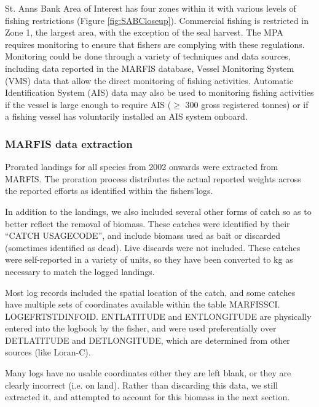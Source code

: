 \documentclass[letterpaper,portrait,11pt]{scrartcl}
\numberwithin{equation}{section}    %
\numberwithin{figure}{section}    %
\numberwithin{table}{section}       %
\begin{document}
St. Anns Bank Area of Interest has four zones within it with various levels of fishing restrictions (Figure \ref{fig:SABCloseup}). Commercial fishing is restricted in Zone 1, the largest area, with the exception of the seal harvest. The MPA requires monitoring to ensure that fishers are complying with these regulations. Monitoring could be done through a variety of techniques and data sources, including data reported in the MARFIS database, Vessel Monitoring System (VMS) data that allow the direct monitoring of fishing activities. Automatic Identification System (AIS) data may also be used to monitoring fishing activities if the vessel is large enough to require AIS ($\geq$ 300 gross registered tonnes) or if a fishing vessel has voluntarily installed an AIS system onboard.  


\subsubsection{MARFIS data extraction}

Prorated landings for all species from 2002 onwards were extracted from MARFIS. The proration process distributes the actual reported weights across the reported efforts as identified within the fishers\textquoteright logs.  

In addition to the landings, we also included several other forms of catch so as to better reflect the removal of biomass. These catches were identified by their \textquotedblleft CATCH \textunderscore USAGE\textunderscore CODE\textquotedblright, and include biomass used as bait or discarded (sometimes identified as dead).  Live discards were not included.  These catches were self-reported in a variety of units, so they have been converted to kg as necessary to match the logged landings. 

Most log records included the spatial location of the catch, and some catches have multiple sets of coordinates available within the table MARFISSCI. LOG\textunderscore EFRT\textunderscore STD\textunderscore INFO\textunderscore ID.  ENT\textunderscore LATITUDE and ENT\textunderscore LONGITUDE are physically entered into the logbook by the fisher, and were used preferentially over DET\textunderscore LATITUDE  and DET\textunderscore LONGITUDE, which are determined from other sources (like Loran-C).  

Many logs have no usable coordinates \textendash  either they are left blank, or they are clearly incorrect (i.e. on land).  Rather than discarding this data, we still extracted it, and attempted to account for this biomass in the next section.
\end{document}
